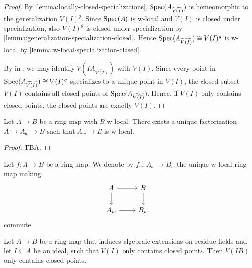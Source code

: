 \begin{proof}
    \leanok
    By \ref{lemma:locally-closed-specializations}, $\mathrm{Spec}(A_{\widetilde{V(I)}})$ is homeomorphic
    to the generalization $V(I)^g$. Since $\mathrm{Spec}(A)$ is w-local and $V(I)$ is closed
    under specialization, also $V(I)^g$ is closed under specialization by
    \ref{lemma:generalization-specialization-closed}. Hence
    $\mathrm{Spec}(A_{\widetilde{V(I)}}) \cong V(I)^g$ is w-local by \ref{lemma:w-local-specialization-closed}.

    By  in , we may identify $V(IA_{\widetilde{V(I)}})$ with
    $V(I)$.
    Since every point in
    $\mathrm{Spec}(A_{\widetilde{V(I)}}) \cong V(I)^g$ specializes to a unique point in $V(I)$,
    the closed subset $V(I)$ contains all closed points of $\mathrm{Spec}(A_{\widetilde{V(I)}})$. Hence,
    if $V(I)$ only contains closed points, the closed points are exactly $V(I)$.
\end{proof}

\begin{proposition}
    Let $A \to B$ be a ring map with $B$ w-local. There exists a unique
    factorization $A \to A_w \to B$ such that $A_w \to B$ is w-local.
    \label{lemma:univ-prop-w-localization}
\end{proposition}

\begin{proof}
    TBA.
\end{proof}

\begin{definition}
    Let $f\colon A \to B$ be a ring map. We denote by $f_w\colon A_w \to B_w$ the
    unique w-local ring map making
    \[
    \begin{tikzcd}
        A \arrow{r} \arrow{d} & B \arrow{d} \\
        A_w \arrow{r} & B_w
    \end{tikzcd}
    \] commute.
    \label{def:w-localization-map}
\end{definition}

\begin{lemma}
    Let $A \to B$ be a ring map that induces algebraic extensions on residue fields
    and let $I \subseteq A$ be an ideal, such that $V(I)$ only contains closed points.
    Then $V(IB)$ only contains closed points.
    \label{lemma:preimage-closed-points-algebraic}
    \leanok
\end{lemma}

